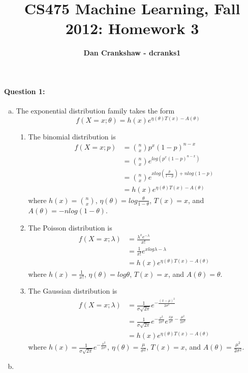 \documentclass[letterpaper,11pt]{article}
\title{CS475 Machine Learning, Fall 2012: Homework 3}
\date{}
\author{\bf Dan Crankshaw - dcranks1}
\begin{document}
\maketitle


\paragraph{Question 1:}
\begin{enumerate}[(a)]
\item  The exponential distribution family takes the form
  \begin{equation}
  f(X=x;\theta) = h(x) e^{\eta(\theta) T(x) - A(\theta)}
  \end{equation}
\begin{enumerate}[(1)]
\item
  The binomial distribution is
  \begin{align}
  f(X=x;p) & = \binom{n}{x} p^x (1-p)^{n-x}\\
           & = \binom{n}{x} e^{log(p^x (1-p)^{n-x})}\\
           & = \binom{n}{x} e^{x log(\frac{p}{1-p}) + nlog(1-p)}\\
           & = h(x) e^{\eta(\theta) T(x) - A(\theta)}
  \end{align}
 where $h(x) = \binom{n}{x}$, $\eta(\theta) = log \frac{\theta}{1 - \theta}$, $T(x) = x$, and $A(\theta) = -nlog(1-\theta)$.

\item
  The Poisson distribution is
  \begin{align}
  f(X=x;\lambda) & = \frac{\lambda^x e^{-\lambda}}{x!}\\
                 & = \frac{1}{x!} e^{x log \lambda - \lambda}\\
                 & = h(x) e^{\eta(\theta) T(x) - A(\theta)}
  \end{align}
 where $h(x) = \frac{1}{x!}$, $\eta(\theta) = log \theta$, $T(x) = x$, and $A(\theta) = \theta$.
\item
  The Gaussian distribution is
  \begin{align}
  f(X=x;\lambda) & = \frac{1}{\sigma \sqrt{2 \pi}} e^{-\frac{(x-\mu)^2}{2\sigma^2}}\\
                 & = \frac{1}{\sigma \sqrt{2 \pi}} e^{-\frac{x^2}{2\sigma^2}} e^{\frac{x \mu}{\sigma^2} - \frac{\mu^2}{2 \sigma^2}}\\
                 & = h(x) e^{\eta(\theta) T(x) - A(\theta)}
  \end{align}
 where $h(x) = \frac{1}{\sigma \sqrt{2 \pi}} e^{-\frac{x^2}{2\sigma^2}}$, $\eta(\theta) = \frac{\mu}{\sigma^2}$, $T(x) = x$, and $A(\theta) = \frac{\mu^2}{2 \sigma^2}$.
\end{enumerate}
\item


\end{enumerate}
\end{document}
